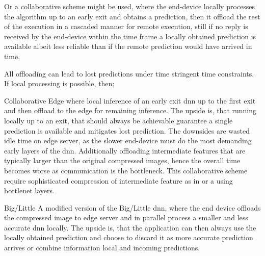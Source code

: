 Or a collaborative scheme might be used, where the end-device locally processes the algorithm up to an early exit and obtains a prediction, then it offload the rest of the execution in a cascaded manner for remote execution, still if no reply is received by the end-device within the time frame a locally obtained prediction is available albeit less reliable than if the remote prediction would have arrived in time. 

All offloading can lead to lost predictions under time stringent time constraints. If local processing is possible, then;

\begin{enumdescript}
	\item[Collaborative Edge] where local inference of an early exit \gls{dnn} up to the first exit and then offload to the edge for remaining inference. The upside is, that running locally up to an exit, that should always be achievable guarantee a single prediction is available and mitigates lost prediction. The downsides are wasted idle time on edge server, as the slower end-device must do the most demanding early layers of the \gls{dnn}. Additionally offloading intermediate features that are typically larger than the original compressed images, hence the overall time becomes worse as communication is the bottleneck. This collaborative scheme require sophisticated compression of intermediate feature as in \cite{choi_near-lossless_2018} or a using \gls{bottlenet} layers.
	\item[Big/Little] A modified version of the Big/Little \gls{dnn}, where the end device offloads the compressed image to edge server and in parallel process a smaller and less accurate \gls{dnn} locally. The upside is, that the application can then always use the locally obtained prediction and choose to discard it as more accurate prediction arrives or combine information local and incoming predictions.
\end{enumdescript}

